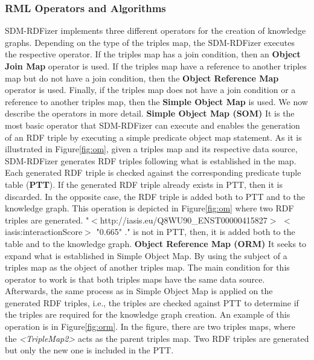 \subsubsection{RML Operators and Algorithms}
\label{operators}
SDM-RDFizer implements three different operators for the creation of knowledge graphs. Depending on the type of the triples map, the SDM-RDFizer executes the respective operator. If the triples map has a join condition, then an \textbf{Object Join Map} operator is used. If the triples map have a reference to another triples map but do not have a join condition, then the \textbf{Object Reference Map} operator is used. Finally, if the triples map does not have a join condition or a reference to another triples map, then the \textbf{Simple Object Map} is used. We now describe the operators in more detail.
\lstset{upquote=true}
\noindent\textbf{Simple Object Map (SOM)}
 It is the most basic operator that SDM-RDFizer can execute and enables the generation of an RDF triple by executing a simple predicate object map statement. As it is illustrated in Figure\autoref{fig:om}, given a triples map and its respective data source, SDM-RDFizer generates RDF triples following what is established in the map. Each generated RDF triple is checked against the corresponding predicate tuple table (\textbf{PTT}). If the generated RDF triple already exists in PTT, then it is discarded. In the opposite case, the RDF triple is added both to PTT and to the knowledge graph. This operation is depicted in Figure\autoref{fig:om} where two RDF triples are generated. "$<$http://iasis.eu/Q8WU90\_ENST00000415827$>$ $<$iasis:interactionScore$>$ "0.665" ." is not in PTT, then, it is added both to the table and to the knowledge graph.  
\lstset{upquote=false}
\noindent\textbf{Object Reference Map (ORM)}
It seeks to expand what is established in Simple Object Map. By using the subject of a triples map as the object of another triples map. The main condition for this operator to work is that both triples maps have the same data source. Afterwards, the same process as in Simple Object Map is applied on the generated RDF triples, i.e., the triples are checked against PTT to determine if the triples are required for the knowledge graph creation. An example of this operation is in Figure\autoref{fig:orm}. In the figure, there are two triples maps, where the \textit{<TripleMap2>} acts as the parent triples map. Two RDF triples are generated but only the new one is included in the PTT. 

